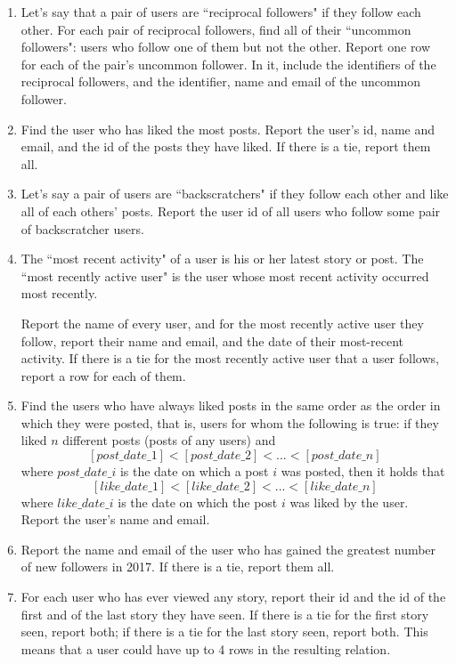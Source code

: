 \documentclass{article}
\begin{document}
\begin{enumerate}
\item   %
Let's say that a pair of users are ``reciprocal followers" if they follow each other. 
For each pair of reciprocal followers, 
find all of their ``uncommon followers": 
users who follow one of them but not the other. 
Report one row for each of the pair's uncommon follower.
In it, include
the identifiers of the reciprocal followers,
and the identifier, name and email of the uncommon follower. 

\item   %
Find the user who has liked the most posts. 
Report the user's id, name and email, and the id of the posts they have liked. 
If there is a tie, report them all.

\item   %
Let's say a pair of users are ``backscratchers" 
if they follow each other and like all of each others' posts. 
Report the user id of all users who follow some pair of backscratcher users.

\item   %
The ``most recent activity" of a user is his or her latest story or post. 
The ``most recently active user" is the user whose most recent activity
occurred most recently.

Report the name of every user,
and for the most recently active user they follow,
report their name and email, and the date of their most-recent activity.
If there is a tie for the most recently active user that a user follows,
report a row for each of them.

\item   %
Find the users who have always liked posts
in the same order as the order in which they were posted,
that is,
users for whom the following is true:
if they liked $n$ different posts (posts of any users)
and
$$[post\_date\_1] < [post\_date\_2] < ... < [post\_date\_n]$$
where $post\_date\_i$ is the date on which a post $i$ was posted, 
then it holds that
$$[like\_date\_1] < [like\_date\_2] < ... < [like\_date\_n]$$ 
where $like\_date\_i$ is the date on which the post $i$ was liked 
by the user.  
Report the user's name and email.

\item   %
Report the name and email of the user
who has gained the greatest number of new followers in 2017. 
If there is a tie, report them all.

\item   %
For each user who has ever viewed any story, 
	report their id and the id of the first and of the last story they have seen.
If there is a tie for the first story seen, report both;
if there is a tie for the last story seen, report both.
This means that a user could have up to 4 rows in the resulting relation.


\end{enumerate}
\end{document}
